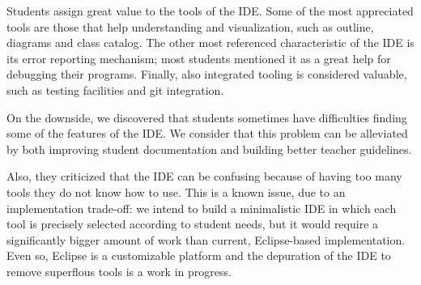 Students assign great value to the tools of the IDE.
Some of the most appreciated tools are those that help understanding and visualization, 
such as outline, diagrams and class catalog.
The other most referenced characteristic of the IDE is its error reporting mechanism;
most students mentioned it as a great help for debugging their programs.
Finally, also integrated tooling is considered valuable, 
such as testing facilities and git integration.




%
%
%
\medskip

On the downside, 
we discovered that students sometimes have difficulties finding some of the features of the IDE.
We consider that this problem can be alleviated by both improving student documentation and building better teacher guidelines.

Also, they criticized that the IDE can be confusing because of having too many tools they do not know how to use.
This is a known issue, due to an implementation trade-off: 
we intend to build a minimalistic IDE in which each tool is precisely selected according to student needs,
but it would require a significantly bigger amount of work than current, Eclipse-based implementation.
Even so, Eclipse is a customizable platform and the depuration of the IDE to remove superflous tools is a work in progress.


